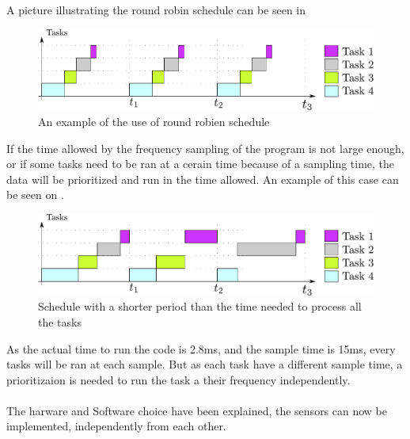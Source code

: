 A picture illustrating the round robin schedule can be seen in \\

 \begin{figure}[H]
	\centering
	\includegraphics[scale=0.5]{figures/roundRobinSchedule.pdf}
	\caption{An example of the use of round robien schedule}
	\label{roundRobinSchedule}
\end{figure}

If the time allowed by the frequency sampling of the program is not large enough, or if some tasks need to be ran at a cerain time because of a sampling time, the data will be prioritized and run in the time allowed. An example of this case can be seen on .

 \begin{figure}[H]
	\centering
	\includegraphics[scale=0.5]{figures/roundRobinSchedule2.pdf}
	\caption{Schedule with a shorter period than the time needed to process all the tasks}
	\label{roundRobinSchedule2}
\end{figure}

As the actual time to run the code is 2.8ms, and the sample time is 15ms, every tasks will be ran at each sample. But as each task have a different sample time, a prioritizaion is needed to run the task a their frequency independently.\\\\



The harware and Software choice have been explained, the sensors can now be implemented, independently from each other.
